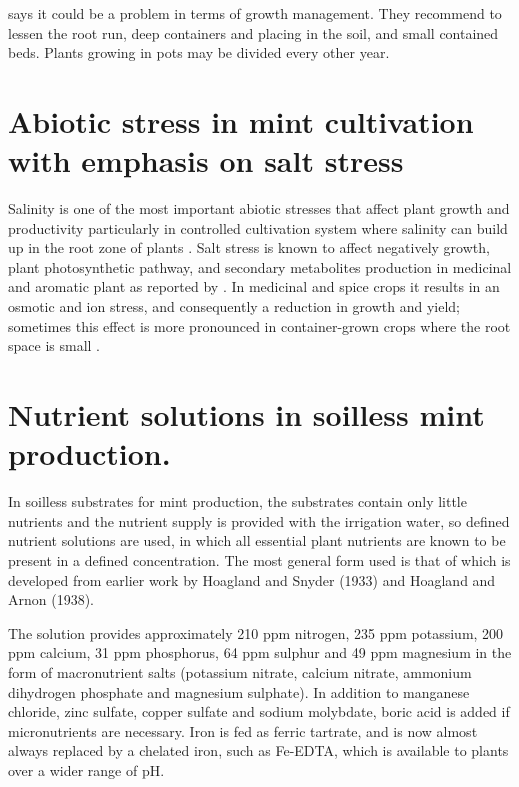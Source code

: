 \textcite{rhs2026crispa} says it could be a problem in terms of growth management. They recommend to lessen the root run, deep containers and placing in the soil, and small contained beds. Plants growing in pots may be divided every other year.

\section{Abiotic stress in mint cultivation with emphasis on salt stress}

Salinity is one of the most important abiotic stresses that affect plant growth and productivity particularly in controlled cultivation system where salinity can build up in the root zone of plants \parencite{Hasanuzzaman2021}. Salt stress is known to affect negatively growth, plant photosynthetic pathway, and secondary metabolites production in medicinal and aromatic plant as reported by \textcite{AcostaMotos2017}. In medicinal and spice crops it results in an osmotic and ion stress, and consequently a reduction in growth and yield; sometimes this effect is more pronounced in container-grown crops where the root space is small \parencite{Hasanuzzaman2021}.

\section{Nutrient solutions in soilless mint production.}

In soilless substrates for mint production, the substrates contain only little nutrients and the nutrient supply is provided with the irrigation water, so defined nutrient solutions are used, in which all essential plant nutrients are known to be present in a defined concentration. The most general form used is that of \textcite{Hoagland1950} which is developed from earlier work by Hoagland and Snyder (1933) and Hoagland and Arnon (1938).

The solution provides approximately 210 ppm nitrogen, 235 ppm potassium, 200 ppm calcium, 31 ppm phosphorus, 64 ppm sulphur and 49 ppm magnesium in the form of macronutrient salts (potassium nitrate, calcium nitrate, ammonium dihydrogen phosphate and magnesium sulphate). In addition to manganese chloride, zinc sulfate, copper sulfate and sodium molybdate, boric acid is added if micronutrients are necessary. Iron is fed as ferric tartrate, and is now almost always replaced by a chelated iron, such as Fe-EDTA, which is available to plants over a wider range of pH.

